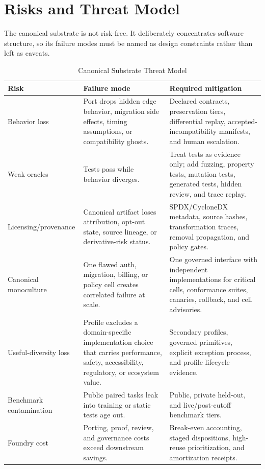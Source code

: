 \section{Risks and Threat Model}
\label{sec:threatmodel}

The canonical substrate is not risk-free. It deliberately concentrates software structure, so its failure modes must be named as design constraints rather than left as caveats.

\begin{table}[t]
\caption{Canonical Substrate Threat Model}
\label{tab:threatmodel}
\centering
\footnotesize
\begin{tabularx}{\textwidth}{p{}X X}
\toprule
Risk & Failure mode & Required mitigation \\
\midrule
Behavior loss & Port drops hidden edge behavior, migration side effects, timing assumptions, or compatibility ghosts. & Declared contracts, preservation tiers, differential replay, accepted-incompatibility manifests, and human escalation. \\
Weak oracles & Tests pass while behavior diverges. & Treat tests as evidence only; add fuzzing, property tests, mutation tests, generated tests, hidden review, and trace replay. \\
Licensing/provenance & Canonical artifact loses attribution, opt-out state, source lineage, or derivative-risk status. & SPDX/CycloneDX metadata, source hashes, transformation traces, removal propagation, and policy gates. \\
Canonical monoculture & One flawed auth, migration, billing, or policy cell creates correlated failure at scale. & One governed interface with independent implementations for critical cells, conformance suites, canaries, rollback, and cell advisories. \\
Useful-diversity loss & Profile excludes a domain-specific implementation choice that carries performance, safety, accessibility, regulatory, or ecosystem value. & Secondary profiles, governed primitives, explicit exception process, and profile lifecycle evidence. \\
Benchmark contamination & Public paired tasks leak into training or static tests age out. & Public, private held-out, and live/post-cutoff benchmark tiers. \\
Foundry cost & Porting, proof, review, and governance costs exceed downstream savings. & Break-even accounting, staged dispositions, high-reuse prioritization, and amortization receipts. \\

\end{tabularx}
\end{table}
